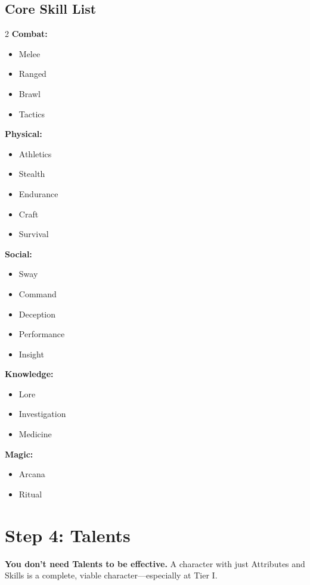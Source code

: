 \documentclass[11pt]{book}
\begin{document}
\subsection*{Core Skill List}
\begin{multicols}{2}
  \textbf{Combat:}
  \begin{itemize}
    \item Melee
    \item Ranged
    \item Brawl
    \item Tactics
  \end{itemize}
  \textbf{Physical:}
  \begin{itemize}
    \item Athletics
    \item Stealth
    \item Endurance
    \item Craft
    \item Survival
  \end{itemize}
  \textbf{Social:}
  \begin{itemize}
    \item Sway
    \item Command
    \item Deception
    \item Performance
    \item Insight
  \end{itemize}
  \textbf{Knowledge:}
  \begin{itemize}
    \item Lore
    \item Investigation
    \item Medicine
  \end{itemize}
  \textbf{Magic:}
  \begin{itemize}
    \item Arcana
    \item Ritual
  \end{itemize}
\end{multicols}

\section{Step 4: Talents}

\begin{tipbox}
\textbf{You don't need Talents to be effective.} A character with just Attributes and Skills is a complete, viable character---especially at Tier I.
\end{tipbox}
\end{document}
